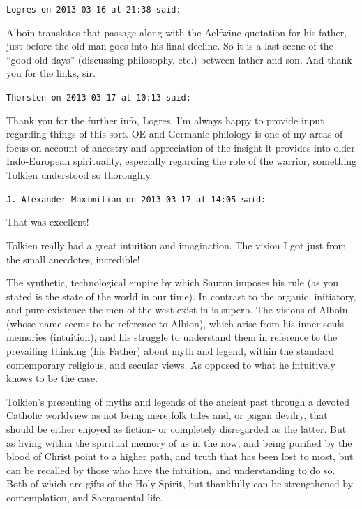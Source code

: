 \begin{footnotesize}
\begin{sffamily}
\hfill

\texttt{Logres on 2013-03-16 at 21:38 said:}

Alboin translates that passage along with the Aelfwine quotation for his father, just before the old man goes into his final decline. So it is a last scene of the ``good old days'' (discussing philosophy, etc.) between father and son. And thank you for the links, sir.

\hfill

\texttt{Thorsten on 2013-03-17 at 10:13 said:}

Thank you for the further info, Logres. I'm always happy to provide input regarding things of this sort. OE and Germanic philology is one of my areas of focus on account of ancestry and appreciation of the insight it provides into older Indo-European spirituality, especially regarding the role of the warrior, something Tolkien understood so thoroughly.

\hfill

\texttt{J. Alexander Maximilian on 2013-03-17 at 14:05 said:}

That was excellent!

Tolkien really had a great intuition and imagination. The vision I got just from the small anecdotes, incredible!

The synthetic, technological empire by which Sauron imposes his rule (as you stated is the state of the world in our time). In contrast to the organic, initiatory, and pure existence the men of the west exist in is superb. The visions of Alboin (whose name seems to be reference to Albion), which arise from his inner souls memories (intuition), and his struggle to understand them in reference to the prevailing thinking (his Father) about myth and legend, within the standard contemporary religious, and secular views. As opposed to what he intuitively knows to be the case.

Tolkien's presenting of myths and legends of the ancient past through a devoted Catholic worldview as not being mere folk tales and, or pagan devilry, that should be either enjoyed as fiction- or completely disregarded as the latter. But as living within the spiritual memory of us in the now, and being purified by the blood of Christ point to a higher path, and truth that has been lost to most, but can be recalled by those who have the intuition, and understanding to do so. Both of which are gifts of the Holy Spirit, but thankfully can be strengthened by contemplation, and Sacramental life.


\end{sffamily}
\end{footnotesize}
